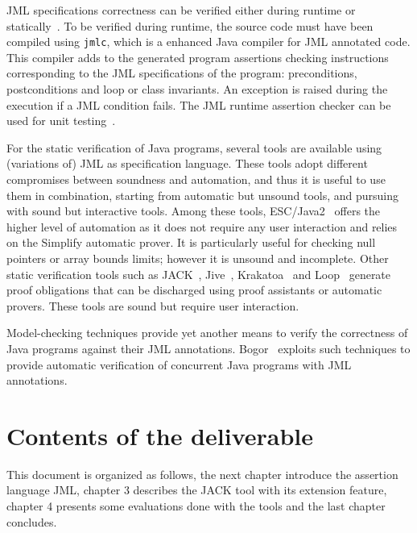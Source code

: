 JML specifications correctness can be verified either during runtime
or statically~\cite{jml:sttt}. To be verified during runtime, the
source code must have been compiled using \texttt{jmlc}, which is a
enhanced Java compiler for JML annotated code. This compiler adds to
the generated program assertions checking instructions corresponding
to the JML specifications of the program: preconditions, postconditions 
and loop or class invariants. An exception is raised during the execution 
if a JML condition fails. The JML runtime assertion checker can be used
for unit testing~\cite{CL02:ecoop}.


For the static verification of Java programs, several tools are
available using (variations of) JML as specification language. These
tools adopt different compromises between soundness and automation,
and thus it is useful to use them in combination, starting from
automatic but unsound tools, and pursuing with sound but interactive
tools.  Among these tools, ESC/Java2~\cite{CK04:cassis} offers the higher
level of automation as it does not require any user interaction and
relies on the Simplify automatic prover. It is particularly useful for
checking null pointers or array bounds limits; however it is unsound
and incomplete. Other static verification tools such as
JACK~\cite{BRL03:fme}, Jive~\cite{jive}, Krakatoa~\cite{MPU03:jlap}
and Loop~\cite{vdBJ01:tacas} generate proof obligations that can be
discharged using proof assistants or automatic provers. These tools
are sound but require user interaction.

Model-checking techniques provide yet another means to verify the
correctness of Java programs against their JML
annotations. Bogor~\cite{robby+04:tacas} exploits such techniques to 
provide automatic verification of concurrent Java programs
with JML annotations.



\section{Contents of the deliverable}
This document is organized as follows, the next chapter introduce the
assertion language JML, chapter 3 describes the JACK tool with its
extension feature, chapter 4 presents some evaluations done with the
tools and the last chapter concludes.
